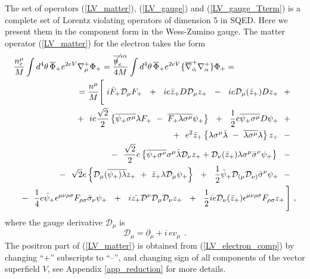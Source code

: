 \documentclass[a4paper,12pt]{article}
\newcommand{\slashed}[1]{\hbox{{$#1$}\llap{$/$}}}
\begin{document}
	The set of operators (\ref{LV_matter}), (\ref{LV_gauge}) and
	(\ref{LV_gauge_Tterm}) is a complete set of Lorentz violating
	operators of dimension 5 in SQED.
	Here we present them in the component form in the Wess-Zumino
	gauge.
	The matter operator (\ref{LV_matter}) for the electron
	takes the form
\begin{eqnarray}
\nonumber
\lefteqn{
   \frac{n_e^\mu}
        {M} \int d^4\theta\, \overline{\Phi}_+ e^{2eV} 
		\nabla_\mu^+ \Phi_+ = 
   \frac{\overline{\slashed{n}}_e^{\dot{\alpha}\alpha}}
	{4 M} \int d^4\theta\, \overline{\Phi}_+ e^{2eV} 
	\{ \overline{\nabla}_{\dot{\alpha}}^+ \nabla_\alpha^+ \} \Phi_+ = 
	}\\
\nonumber
&&
 = \frac{n^\mu}{M} \Bigg [~
    i \bar{F}_+ \mathcal{D}_\mu F_+ ~~+~~
    i e \bar{z}_+ D \mathcal{D}_\mu z_+ ~~-~~
    i e \mathcal{D}_\mu(\bar{z}_+) D z_+ ~~+~~ \\
\label{LV_electron_comp}
&&
  + ~~ 
    i e \frac{\sqrt{2}}{2} \left\{
               \overline{\psi_+\sigma^\mu}\lambda F_+ 
	       ~-~
               \overline{F_+\lambda\sigma^\mu} \psi_+
                         \right\} ~~+~~ 
    \frac{1}{2} e \overline{\psi_+\sigma^\mu}D\psi_+ ~~+~~\\
\nonumber
&&
    +~~
    e^2 \bar{z}_+ \left\{
               \lambda\sigma^\mu\bar{\lambda} 
	       ~-~
               \overline{\lambda\sigma^\mu}\lambda 
                       \right\} z_+ 
  ~~-~~ \\
\nonumber
&&
    -~~ 
    \frac{\sqrt{2}}{2} e \left\{ 
                      \overline{\psi_+\sigma^\nu}\sigma^\mu 
                     \bar{\lambda}\mathcal{D}_\nu z_+ +
                     \mathcal{D}_\nu(\bar{z}_+)\lambda\sigma^\mu
                     \bar{\sigma}^\nu \psi_+
                     \right \}
 ~~-~~ \\
\nonumber
&&
 -~~
   \sqrt{2} e \left\{ 
                     \mathcal{D}_\mu(\overline{\psi_+)\lambda} z_+ 
		     ~+~ 
                     \bar{z}_+ \lambda \mathcal{D}_\mu \psi_+ 
                     \right\} 
 ~~+~~ 
  \frac{1}{2}\bar{\psi}_+\mathcal{D}_{(\mu}\mathcal{D}_{\nu)}
               \bar{\sigma}^\nu \psi_+ 
   ~~-~~ \\
\nonumber
&&
   -~~
  \frac{1}{4} e \bar{\psi}_+\epsilon^{\mu\nu\rho\sigma}
              F_{\rho\sigma} \bar{\sigma}_\nu \psi_+
   ~~+~~
  i \bar{z_+} \mathcal{D}^\nu \mathcal{D}_\mu \mathcal{D}_\nu z_+ 
   ~~+~~
   \frac{1}{2} i e \mathcal{D}_\nu (\bar{z}_+) \epsilon^{\mu\nu\rho\sigma}
              F_{\rho\sigma} z_+ \, 
   \Bigg] ~,
\end{eqnarray}
        where the gauge derivative $ \mathcal{D}_\mu $ is 
$$ 
  \mathcal{D}_\mu = \partial_\mu + i\, e v_\mu~~.
$$
	The positron part of (\ref{LV_matter}) is obtained from
	(\ref{LV_electron_comp}) by changing ``+'' subscripts to
	``--'', and changing sign of all components of the vector
	superfield $ V $, see Appendix \ref{app_reduction} for
	more details.
\end{document}
